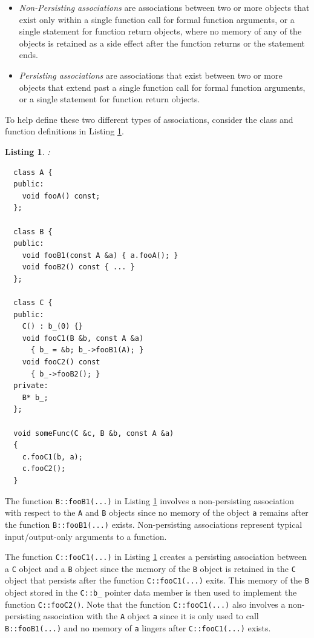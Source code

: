 \documentclass[pdf,ps2pdf,11pt]{SANDreport}
\newtheorem{listing}{Listing}
\begin{document}
\begin{itemize}

{}\item\textit{Non-Persisting associations} are associations between
two or more objects that exist only within a single function call for
formal function arguments, or a single statement for function return
objects, where no memory of any of the objects is retained as a side
effect after the function returns or the statement ends.

{}\item\textit{Persisting associations} are associations that exist
between two or more objects that extend past a single function call
for formal function arguments, or a single statement for function
return objects.

\end{itemize}

To help define these two different types of associations, consider the
class and function definitions in Listing
{}\ref{listing:NonPersistingPersistingAssociationsRawPointers}.

\begin{listing}:\\
\label{listing:NonPersistingPersistingAssociationsRawPointers}
{\small\begin{verbatim}
  class A {
  public:
    void fooA() const;
  };

  class B {
  public:
    void fooB1(const A &a) { a.fooA(); }
    void fooB2() const { ... }
  };

  class C {
  public:
    C() : b_(0) {}
    void fooC1(B &b, const A &a)
      { b_ = &b; b_->fooB1(A); }
    void fooC2() const
      { b_->fooB2(); }
  private:
    B* b_;    
  };

  void someFunc(C &c, B &b, const A &a)
  {
    c.fooC1(b, a);
    c.fooC2();
  }
\end{verbatim}}
\end{listing}

The function {}\texttt{B::fooB1(...)} in Listing
{}\ref{listing:NonPersistingPersistingAssociationsRawPointers}
involves a non-persisting association with respect to the {}\texttt{A}
and {}\texttt{B} objects since no memory of the object {}\texttt{a}
remains after the function {}\texttt{B::fooB1(...)} exists.
Non-persisting associations represent typical input/output-only
arguments to a function.

The function {}\texttt{C::fooC1(...)} in Listing
{}\ref{listing:NonPersistingPersistingAssociationsRawPointers} creates
a persisting association between a {}\texttt{C} object and a
{}\texttt{B} object since the memory of the {}\texttt{B} object is
retained in the {}\texttt{C} object that persists after the function
{}\texttt{C::fooC1(...)} exits.  This memory of the {}\texttt{B}
object stored in the {}\texttt{C::b\_} pointer data member is then
used to implement the function {}\texttt{C::fooC2()}.  Note that the
function {}\texttt{C::fooC1(...)} also involves a non-persisting
association with the {}\texttt{A} object {}\texttt{a} since it is only
used to call {}\texttt{B::fooB1(...)} and no memory of {}\texttt{a}
lingers after {}\texttt{C::fooC1(...)} exists.
\end{document}
